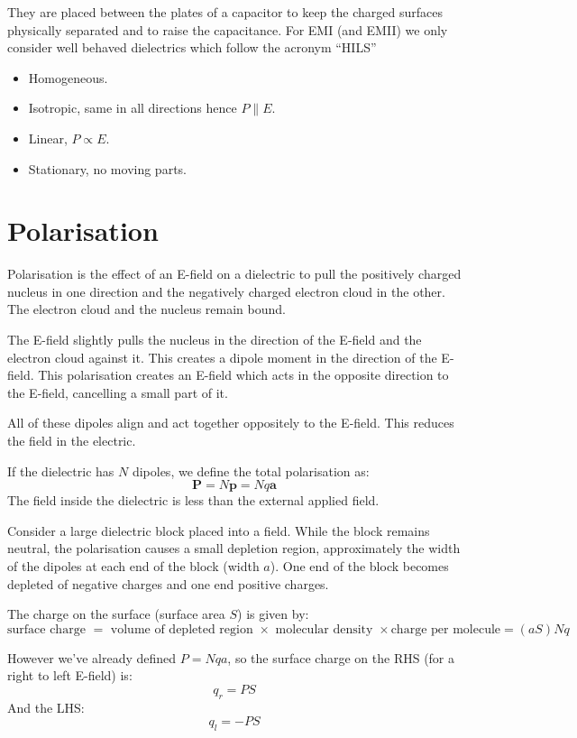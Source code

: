 They are placed between the plates of a capacitor to keep the charged surfaces physically separated and to raise the capacitance. For EMI (and EMII) we only consider well behaved dielectrics which follow the acronym ``HILS''
\begin{itemize}
    \item Homogeneous.
    \item Isotropic, same in all directions hence $P \parallel E$.
    \item Linear, $P \propto E$.
    \item Stationary, no moving parts. 
\end{itemize}

\section{Polarisation}
Polarisation is the effect of an E-field on a dielectric to pull the positively charged nucleus in one direction and the negatively charged electron cloud in the other. The electron cloud and the nucleus remain bound.

The E-field slightly pulls the nucleus in the direction of the E-field and the electron cloud against it. This creates a dipole moment in the direction of the E-field. This polarisation creates an E-field which acts in the opposite direction to the E-field, cancelling a small part of it.

All of these dipoles align and act together oppositely to the E-field. This reduces the field in the electric.

If the dielectric has $N$ dipoles, we define the total polarisation as:
\[
    \pmb{P} = N \pmb{p} = Nq \pmb{a}
\]
The field inside the dielectric is less than the external applied field.

Consider a large dielectric block placed into a field. While the block remains neutral, the polarisation causes a small depletion region, approximately the width of the dipoles at each end of the block (width $a$). One end of the block becomes depleted of negative charges and one end positive charges.

The charge on the surface (surface area $S$) is given by:
\[
    \text{surface charge } = \text{ volume of depleted region } \times \text{ molecular density } \times \text{charge per molecule} = (aS)Nq
\]

However we've already defined $P = Nqa$, so the surface charge on the RHS (for a right to left E-field) is:
\[
    q_r = PS
\]
And the LHS:
\[
    q_l = - PS
\]

